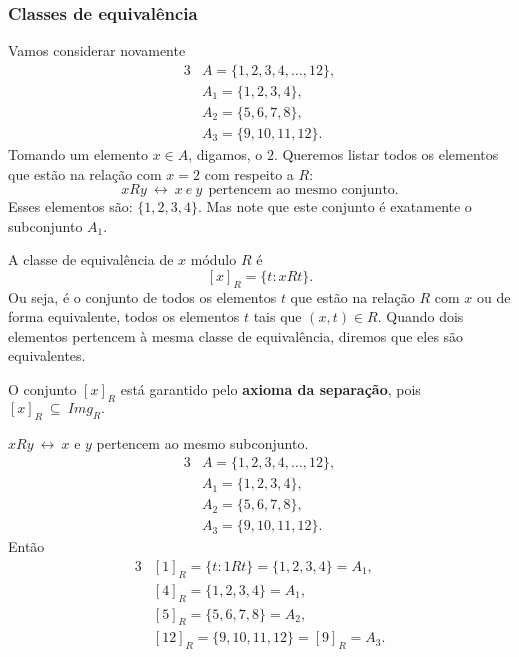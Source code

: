       \subsubsection{Classes de equivalência}\label{subsubsec: CEQ}
         Vamos considerar novamente
         \begin{alignat*}{3}
            &A = \{1,2,3,4, \dots , 12\},\\
            &A_{1} = \{1,2,3,4\},\\
            &A_{2} = \{5,6,7,8\},\\
            &A_{3} = \{9,10,11,12\}.
         \end{alignat*}
         Tomando um elemento $x \in A$, digamos, o $2$. Queremos listar todos os elementos que estão na relação com $x = 2$ com respeito a $R$:
         $$xRy\ \leftrightarrow\ x\ e\ y\ \ \textrm{pertencem\ ao\ mesmo\ conjunto.}$$
         Esses elementos são: $\{1,2,3,4\}.$ Mas note que este conjunto é exatamente o subconjunto $A_{1}$.
         \begin{definition}
            A classe de equivalência de $x$ módulo $R$ é
            $$[x]_{R} = \{t: xRt\}.$$
            Ou seja, é o conjunto de todos os elementos $t$ que estão na relação $R$ com $x$ ou de forma equivalente, todos os elementos $t$ tais que $( x, t ) \in R.$ Quando dois elementos pertencem à mesma classe de equivalência, diremos que eles são equivalentes.
         \end{definition}
         O conjunto $[x]_{R}$ está garantido pelo \textbf{axioma da separação}, pois $[x]_{R}\ \subseteq\ \mathit{Img}_{R}.$
         \begin{exmp}
            $xRy\ \leftrightarrow\ x$ e $y$ pertencem ao mesmo subconjunto.
            \begin{alignat*}{3}
               &A = \{1,2,3,4, \dots , 12\},\\
               &A_{1} = \{1,2,3,4\},\\
               &A_{2} = \{5,6,7,8\},\\
               &A_{3} = \{9,10,11,12\}.
            \end{alignat*}
            Então
            \begin{alignat*}{3}
               &[1]_{R} = \{t: 1Rt\} = \{1,2,3,4\} = A_{1},\\
               &[4]_{R} = \{1,2,3,4\} = A_{1},\\
               &[5]_{R} = \{5,6,7,8\} = A_{2},\\
               &[12]_{R} = \{9,10,11,12\} = [9]_{R} = A_{3}.
            \end{alignat*}
         \end{exmp}
